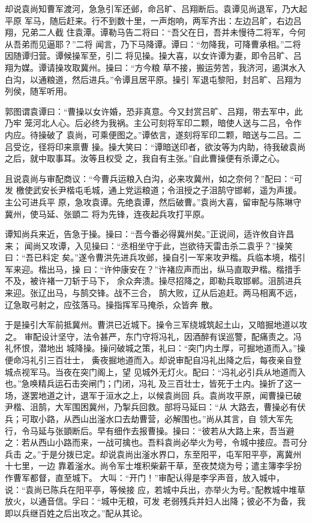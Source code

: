 却说袁尚知曹军渡河，急急引军还邺，命吕旷、吕翔断后。袁谭见尚退军，乃大起平原
军马，随后赶来。行不到数十里，一声炮响，两军齐出：左边吕旷，右边吕翔，兄弟二人截
住袁潭。谭勒马告二将曰：“吾父在日，吾并未慢待二将军，今何从吾弟而见逼耶？”二将
闻言，乃下马降谭。谭曰：“勿降我，可降曹承相。”二将因随谭归营。谭候操军至，引二
将见操。操大喜，以女许谭为妻，即令吕旷、吕翔为媒。谭请操攻取冀州。操曰：“方今粮
草不接，搬运劳苦，我济河，遏淇水入白沟，以通粮道，然后进兵。”令谭且居平原。操引
军退屯黎阳，封吕旷、吕翔为列侯，随军听用。

郭图谓袁谭曰：“曹操以女许婚，恐非真意。今又封赏吕旷、吕翔，带去军中，此乃牢
笼河北人心。后必终为我祸。主公可刻将军印二颗，暗使人送与二吕，令作内应。待操破了
袁尚，可乘便图之。”谭依言，遂刻将军印二颗，暗送与二吕。二吕受讫，径将印来禀曹
操。操大笑曰：“谭暗送印者，欲汝等为内助，待我破袁尚之后，就中取事耳。汝等且权受
之，我自有主张。”自此曹操便有杀谭之心。

且说袁尚与审配商议：“今曹兵运粮入白沟，必来攻冀州，如之奈何？”配曰：“可发
檄使武安长尹楷屯毛城，通上党运粮道；令沮授之子沮鹄守邯郸，遥为声援。主公可进兵平
原，急攻袁谭。先绝袁谭，然后破曹。”袁尚大喜，留审配与陈琳守冀州，使马延、张顗二
将为先锋，连夜起兵攻打平原。

谭知尚兵来近，告急于操。操曰：“吾今番必得冀州矣。”正说间，适许攸自许昌来；
闻尚又攻谭，入见操曰：“丞相坐守于此，岂欲待天雷击杀二袁乎？”操笑曰：“吾已料定
矣。”遂令曹洪先进兵攻邺，操自引一军来攻尹楷。兵临本境，楷引军来迎。楷出马，操
曰：“许仲康安在？”许褚应声而出，纵马直取尹楷。楷措手不及，被许褚一刀斩于马下，
余众奔溃。操尽招降之，即勒兵取邯郸。沮鹄进兵来迎。张辽出马，与鹄交锋。战不三合，
鹄大败，辽从后追赶。两马相离不远，辽急取弓射之，应弦落马。操指挥军马掩杀，众皆奔
散。

于是操引大军前抵冀州。曹洪已近城下。操令三军绕城筑起土山，又暗掘地道以攻之。
审配设计坚守，法令甚严，东门守将冯礼，因酒醉有误巡警，配痛责之。冯礼怀恨，潜地出
城降操。操问破城之策，礼曰：“突门内土厚，可掘地道而入。”操便命冯礼引三百壮士，
夤夜掘地道而入。却说审配自冯礼出降之后，每夜亲自登城点视军马。当夜在突门阁上，望
见城外无灯火。配曰：“冯礼必引兵从地道而入也。”急唤精兵运石击突闸门；门闭，冯礼
及三百壮士，皆死于土内。操折了这一场，遂罢地道之计，退军于洹水之上，以候袁尚回
兵。袁尚攻平原，闻曹操已破尹楷、沮鹄，大军围困冀州，乃掣兵回救。部将马延曰：“从
大路去，曹操必有伏兵；可取小路，从西山出滏水口去劫曹营，必解围也。”尚从其言，自
领大军先行，令马延与张顗断后。早有细作去报曹操。操曰：“彼若从大路上来，吾当避
之：若从西山小路而来，一战可擒也。吾料袁尚必举火为号，令城中接应。吾可分兵击
之。”于是分拨已定。却说袁尚出滏水界口，东至阳平，屯军阳平亭，离冀州十七里，一边
靠着滏水。尚令军士堆积柴薪干草，至夜焚烧为号；遣主簿李孚扮作曹军都督，直至城下。
大叫：“开门！”审配认得是李孚声音，放入城中，说：“袁尚已陈兵在阳平亭，等候接
应，若城中兵出，亦举火为号。”配教城中堆草放火，以通音信。孚曰：“城中无粮，可发
老弱残兵并妇人出降；彼必不为备，我即以兵继百姓之后出攻之。”配从其论。

